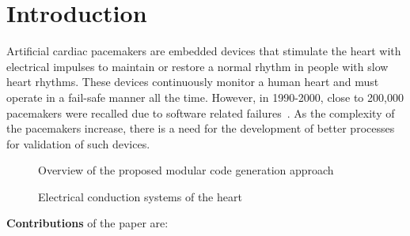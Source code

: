 \section{Introduction}

Artificial cardiac pacemakers are embedded devices that 
stimulate the heart with electrical impulses to 
maintain or restore a normal rhythm in people with slow heart rhythms.
These devices continuously monitor a human heart and must operate in a 
fail-safe manner all the time. 
However, in 1990-2000, close to 200,000 pacemakers were 
recalled due to software related failures~\cite{alemzadeh13}.
As the complexity of the pacemakers increase, there is a need for the
development of better processes for validation of such
devices.




\begin{figure}[bthp]
  \centering \scalebox{0.7}{  }
  \caption{Overview of the proposed modular code generation
    approach \label{fig:overview}}
\end{figure}

\begin{figure*}[hbpt]
  \centering 
  \caption{Electrical conduction systems of the heart}
  \label{fig:heartOverview}
\end{figure*}

\textbf{Contributions} of the paper are:  



